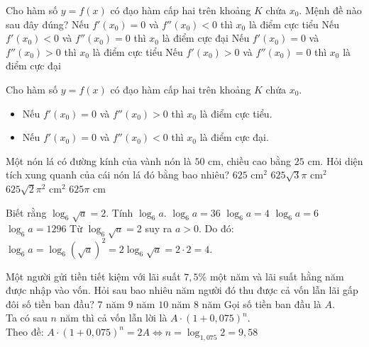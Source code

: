 \begin{ex}%
 Cho hàm số $y = f(x)$ có đạo hàm cấp hai trên khoảng $K$ chứa $x_0$. Mệnh đề nào sau đây đúng?
 \choice
  {Nếu $f'(x_0) = 0$ và $f''(x_0) < 0$ thì $x_0$ là điểm cực tiểu}
  {Nếu $f'(x_0) < 0$ và $f''(x_0) = 0$ thì $x_0$ là điểm cực đại}
  {\True Nếu $f'(x_0) = 0$ và $f''(x_0) > 0$ thì $x_0$ là điểm cực tiểu}
  {Nếu $f'(x_0) > 0$ và $f''(x_0) = 0$ thì $x_0$ là điểm cực đại}
 \loigiai
  {
  Cho hàm số $y = f(x)$ có đạo hàm cấp hai trên khoảng $K$ chứa $x_0$.
  \begin{itemize}
  \item Nếu $f'(x_0) = 0$ và $f''(x_0) > 0$ thì $x_0$ là điểm cực tiểu.
  \item Nếu $f'(x_0) = 0$ và $f''(x_0) < 0$ thì $x_0$ là điểm cực đại.
  \end{itemize}  }
\end{ex}


\begin{ex}%
 Một nón lá có đường kính của vành nón là $50$ cm, chiều cao bằng $25$ cm. Hỏi diện tích xung quanh của cái nón lá đó bằng bao nhiêu?
 \choice
  {$625 \textrm{ cm}^2$}
  {$625\sqrt{3} \pi \textrm{ cm}^2$}
  {\True $625\sqrt{2} \pi^2 \textrm{ cm}^2$}
  {$625\pi \textrm{ cm}$}
\end{ex}


\begin{ex}%
 Biết rằng $\log_6 \sqrt{a} = 2$. Tính $\log_6 a$.
 \choice
  {$\log_6 a = 36$}
  {\True $\log_6 a = 4$}
  {$\log_6 a = 6$}
  {$\log_6 a = 1296$}
 \loigiai
  {
  Từ $\log_6 \sqrt{a} = 2$ suy ra $a>0$. Do đó: $\log_6 a = \log_6 (\sqrt{a})^2 = 2\log_6 \sqrt{a} = 2 \cdot 2 = 4$.
  }
\end{ex}


\begin{ex}%
 Một người gửi tiền tiết kiệm với lãi suất $7{,}5\%$ một năm và lãi suất hằng năm được nhập vào vốn. Hỏi sau bao nhiêu năm người đó thu được cả vốn lẫn lãi gấp đôi số tiền ban đầu?
 \choice
  {$7$ năm}
  {$9$ năm}
  {\True $10$ năm}
  {$8$ năm}
 \loigiai
  {
  Gọi số tiền ban đầu là $A$.\\
  Ta có sau $n$ năm thì cả vốn lẫn lời là $A\cdot(1+0,075)^n$.\\
  Theo đề: $A\cdot(1+0,075)^n=2A\Leftrightarrow n=\log_{1,075}2=9,58$
  }
\end{ex}


